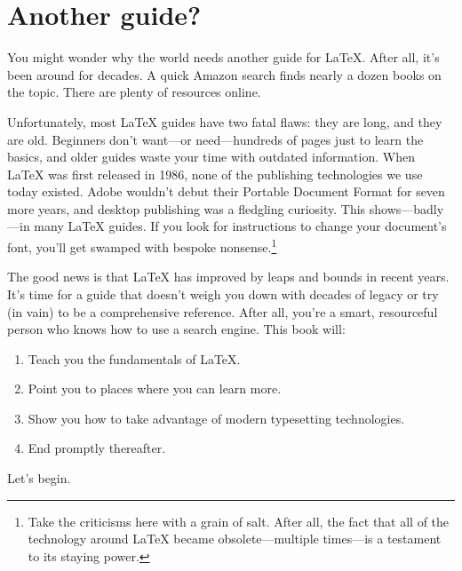 \section{Another guide?}

You might wonder why the world needs another guide for \LaTeX{}.
After all, it's been around for decades.
A quick Amazon search finds nearly a dozen books on the topic.
There are plenty of resources online.

Unfortunately, most \LaTeX{} guides have two fatal flaws:
they are long, and they are old.
Beginners don't want---or need---hundreds of pages just to learn the basics,
and older guides waste your time with outdated information.
When \LaTeX{} was first released in 1986, none of the publishing technologies
we use today existed.
Adobe wouldn't debut their Portable Document Format for seven more years,
and desktop publishing was a fledgling curiosity.
This shows---badly---in many \LaTeX{} guides.
If you look for instructions to change your document's font,
you'll get swamped with bespoke nonsense.\punckern\footnote{%
Take the criticisms here with a grain of
salt. After all, the fact that all of the technology around \LaTeX{} became
obsolete---multiple times---is a testament to its staying power.}

The good news is that  \LaTeX{} has improved by leaps and bounds in recent years.
It's time for a guide that doesn't weigh you down with decades of legacy
or try (in vain) to be a comprehensive reference.
After all, you're a smart, resourceful person who knows how to use a
search engine.
This book will:

\begin{enumerate}
\item Teach you the fundamentals of \LaTeX.
\item Point you to places where you can learn more.
\item Show you how to take advantage of modern typesetting technologies.
\item End promptly thereafter.
\end{enumerate}
\vspace{\baselineskip}

\noindent Let's begin.
